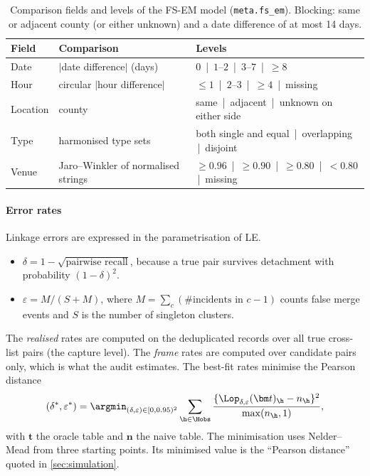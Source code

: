 \begin{table}[tp]
\centering
\caption{Comparison fields and levels of the FS-EM model (\texttt{meta.fs\_em}). Blocking: same or adjacent county (or either unknown) and a date difference of at most 14 days.}\label{tab:sim-fsem}
\small
\begin{tabular}{@{}lll@{}}
\toprule
Field & Comparison & Levels \\
\midrule
Date & $|$date difference$|$ (days) & $0$ \,|\, $1$--$2$ \,|\, $3$--$7$ \,|\, $\ge8$ \\
Hour & circular $|$hour difference$|$ & $\le1$ \,|\, $2$--$3$ \,|\, $\ge4$ \,|\, missing \\
Location & county & same \,|\, adjacent \,|\, unknown on either side \\
Type & harmonised type sets & both single and equal \,|\, overlapping \,|\, disjoint \\
Venue & Jaro--Winkler of normalised strings & $\ge0.96$ \,|\, $\ge0.90$ \,|\, $\ge0.80$ \,|\, $<0.80$ \,|\, missing \\
\bottomrule
\end{tabular}
\end{table}

\paragraph{Error rates} Linkage errors are expressed in the parametrisation of LE.
\begin{itemize}
  \item $\delta=1-\sqrt{\text{pairwise recall}}$, because a true pair survives detachment with probability $(1-\delta)^2$.
  \item $\varepsilon=M/(S+M)$, where $M=\sum_c(\#\text{incidents in }c-1)$ counts false merge events and $S$ is the number of singleton clusters.
\end{itemize}
The \emph{realised} rates are computed on the deduplicated records over all true cross-list pairs (the capture level). The \emph{frame} rates are computed over candidate pairs only, which is what the audit estimates. The best-fit rates minimise the Pearson distance
\[
  (\delta^\ast,\varepsilon^\ast)=\argmin_{(\delta,\varepsilon)\in[0,0.95)^2}\sum_{\h\in\Hobs}\frac{\{\Lop_{\delta,\varepsilon}(\bm t)_{\h}-n_{\h}\}^2}{\max(n_{\h},1)},
\]
with $\bm t$ the oracle table and $\bm n$ the naive table. The minimisation uses Nelder--Mead from three starting points. Its minimised value is the ``Pearson distance'' quoted in \cref{sec:simulation}.

